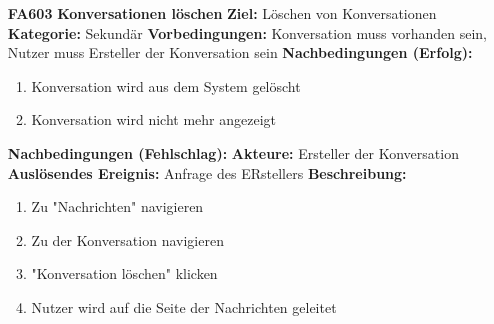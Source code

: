 \documentclass[parskip=full]{scrartcl}
\begin{document}
\begin{itemize}[nosep]
			
			\item[\textbf{FA603}]\textbf{ Konversationen löschen} \label{sec:FA603}
			\newline \textbf{Ziel:} Löschen von Konversationen
			\newline \textbf{Kategorie:} Sekundär
			\newline \textbf{Vorbedingungen:} Konversation muss vorhanden sein, Nutzer muss Ersteller der Konversation sein
			\newline \textbf{Nachbedingungen (Erfolg):} 
			\begin{enumerate}[nosep]
				\item Konversation wird aus dem System gelöscht
				\item Konversation wird nicht mehr angezeigt 
			\end{enumerate}
			\textbf{Nachbedingungen (Fehlschlag):}
			\newline \textbf{Akteure:} Ersteller der Konversation
			\newline \textbf{Auslösendes Ereignis:} Anfrage des ERstellers
			\newline \textbf{Beschreibung:}
			\begin{enumerate}[nosep]
				\item Zu "Nachrichten" navigieren
				\item Zu der Konversation navigieren
				\item "Konversation löschen" klicken
				\item Nutzer wird auf die Seite der Nachrichten geleitet\\
			\end{enumerate}							
		\end{itemize}
		
\end{document}
